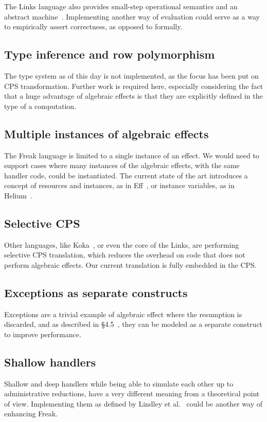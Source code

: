 \documentclass[declaration,shortabstract]{iithesis}
\theoremstyle{definition} \newtheorem{definition}{Definition}[chapter]
\theoremstyle{remark} \newtheorem{remark}[definition]{Observation}
\theoremstyle{plain} \newtheorem{theorem}[definition]{Theorem}
\theoremstyle{plain} \newtheorem{lemma}[definition]{Lemma}
\begin{document}
    The Links language also provides small-step operational semantics and
    an abstract machine~\cite{liberating-effects}. Implementing another way
    of evaluation could serve as a way to empirically assert correctness,
    as opposed to formally.

    \subsection{Type inference and row polymorphism}

    The type system as of this day is not implemented, as the focus has been put
    on CPS transformation. Further work is required here, especially considering
    the fact that a huge advantage of algebraic effects is that they are explicitly
    defined in the type of a computation.

    \subsection{Multiple instances of algebraic effects}

    The Freak language is limited to a single instance of an effect. We would
    need to support cases where many instances of the algebraic effects, with
    the same handler code, could be instantiated. The current state of the
    art introduces a concept of resources and instances, as in Eff~\cite{programming-in-eff},
    or instance variables, as in Helium~\cite{binders-labels}.

    \subsection{Selective CPS}

    Other languages, like Koka~\cite{leijen-koka}, or even the core of the Links, are
    performing selective CPS translation, which reduces the overhead on code
    that does not perform algebraic effects. Our current translation is fully
    embedded in the CPS.\@

    \subsection{Exceptions as separate constructs}

    Exceptions are a trivial example of algebraic effect where the resumption is
    discarded, and as described in \S 4.5~\cite{handlers-cps}, they can be modeled
    as a separate construct to improve performance.

    \subsection{Shallow handlers}

    Shallow and deep handlers while being able to simulate each other up to
    administrative reductions, have a very different meaning from a theoretical point
    of view. Implementing them as defined by Lindley et al.~\cite{shallow-handlers}
    could be another way of enhancing Freak.



\printbibliography{}
\end{document}
